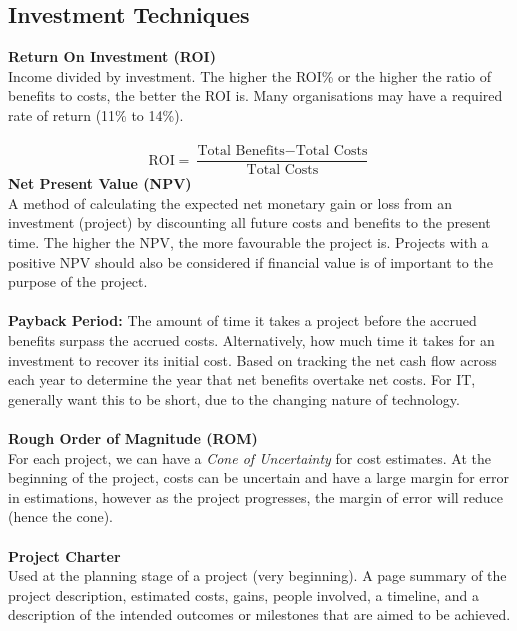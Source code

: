 \documentclass[a4paper,10pt]{article}
\begin{document}
\subsection*{Investment Techniques}
\textcolor{BlueGreen}{\textbf{Return On Investment (ROI)}} \\
Income divided by investment. The higher the ROI\% or the higher the ratio of benefits to costs, the better the ROI is. Many organisations may have a required rate of return (11\% to 14\%). \\\\
\begin{equation*}
	\text{ROI} = \frac{\text{Total Benefits} - \text{Total Costs}}{\text{Total Costs}}
\end{equation*}
\newline
\textcolor{BlueGreen}{\textbf{Net Present Value (NPV)}}\\
A method of calculating the expected net monetary gain or loss from an investment (project) by discounting all future costs and benefits to the present time. The higher the NPV, the more favourable the project is. Projects with a positive NPV should also be considered if financial value is of important to the purpose of the project. \\\\
\textcolor{BlueGreen}{\textbf{Payback Period:}} The amount of time it takes a project before the accrued benefits surpass the accrued costs. Alternatively, how much time it takes for an investment to recover its initial cost. Based on tracking the net cash flow across each year to determine the year that net benefits overtake net costs. For IT, generally want this to be short, due to the changing nature of technology. \\\\
\textcolor{BlueGreen}{\textbf{Rough Order of Magnitude (ROM)}} \\
For each project, we can have a \emph{Cone of Uncertainty} for cost estimates. At the beginning of the project, costs can be uncertain and have a large margin for error in estimations, however as the project progresses, the margin of error will reduce (hence the cone). \\\\
\textcolor{BlueGreen}{\textbf{Project Charter}} \\
Used at the planning stage of a project (very beginning). A page summary of the project description, estimated costs, gains, people involved, a timeline, and a description of the intended outcomes or milestones that are aimed to be achieved. 
\end{document}
